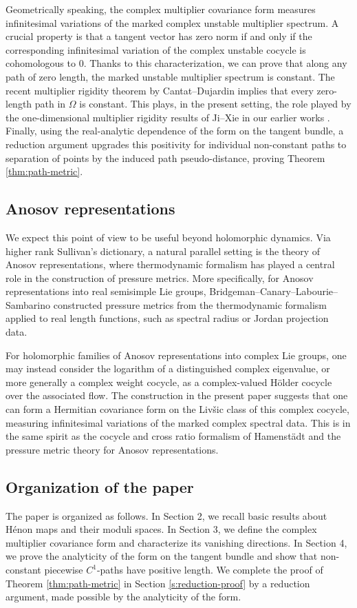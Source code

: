 \documentclass[11pt]{amsart}
\theoremstyle{plain}
\theoremstyle{definition}
\theoremstyle{remark}
\begin{document}
Geometrically speaking, the complex multiplier covariance form measures infinitesimal variations of the marked complex unstable multiplier spectrum. A 
crucial property is that a
tangent vector has zero norm if and only if the corresponding infinitesimal variation of the complex unstable cocycle is  cohomologous to $0$.
Thanks to this 
characterization, we can prove that
along any path of zero length, the marked unstable multiplier spectrum is constant.
The
recent
multiplier rigidity theorem by
Cantat--Dujardin \cite{CD26Henon} implies that every zero-length path in $\Omega$ is constant.
This plays, in the present 
setting, the role played by the one-dimensional multiplier rigidity
results of Ji--Xie \cite{JiXie23} in our earlier works
\cite{BH24,BH25}. Finally, using the real-analytic dependence of the
form on the tangent bundle, a reduction argument upgrades this
positivity for individual non-constant paths to separation of points
by the induced path pseudo-distance, proving Theorem
\ref{thm:path-metric}.


\subsection{Anosov representations}
We expect this point of view to be useful beyond holomorphic dynamics. Via higher rank Sullivan's dictionary, a natural parallel setting is the theory of Anosov representations, where thermodynamic formalism has  played a central role in the construction of pressure metrics. More specifically,
for Anosov representations into real semisimple Lie groups, Bridgeman--Canary--Labourie--Sambarino \cite{BCLS15} constructed pressure metrics from the thermodynamic formalism applied to real length functions, such as spectral radius or Jordan projection data. 

For holomorphic families of Anosov representations into complex Lie groups, one may instead consider the logarithm of a distinguished complex eigenvalue, or more generally a complex weight cocycle, as a complex-valued H\"older cocycle over the associated flow. The construction in the present paper suggests that one can form a Hermitian covariance form on the Liv\v{s}ic class of this complex cocycle, measuring infinitesimal variations of the marked complex spectral data. This is in the same spirit as the cocycle and cross ratio formalism of Hamenst\"adt \cite{Hamenstadt97,Hamenstadt99} and the pressure metric theory for Anosov representations. 


\subsection{Organization of the paper} 
The paper is organized as follows. In Section 2, we recall basic results about H\'enon maps and their moduli spaces. In Section 3, we define the complex multiplier covariance form and characterize its vanishing directions. 
In Section 4,
we prove the analyticity of the form on the tangent bundle
and show
that non-constant piecewise $C^1$-paths have
positive length.
We complete the proof of 
 Theorem \ref{thm:path-metric}
 in Section \ref{s:reduction-proof} 
 by a
 reduction argument, made possible by the analyticity of the form.
\end{document}
